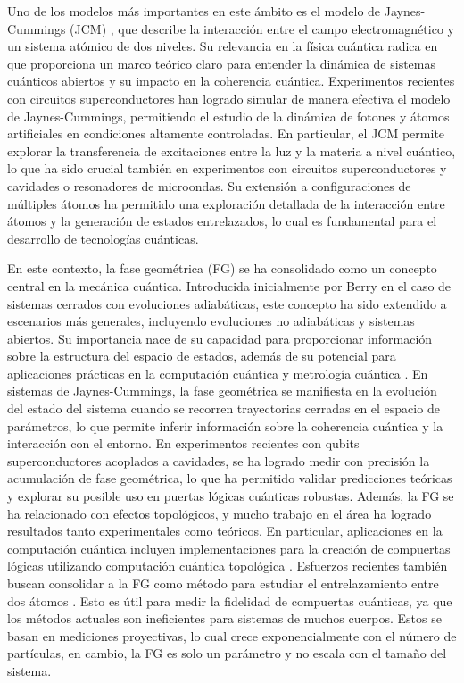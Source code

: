 Uno de los modelos más importantes en este ámbito es el modelo de Jaynes-Cummings (JCM) \cite{JCoriginal}, que describe la interacción entre el campo electromagnético y un sistema atómico de dos niveles. Su relevancia en la física cuántica radica en que proporciona un marco teórico claro para entender la dinámica de sistemas cuánticos abiertos y su impacto en la coherencia cuántica. Experimentos recientes con circuitos superconductores han logrado simular de manera efectiva el modelo de Jaynes-Cummings, permitiendo el estudio de la dinámica de fotones y átomos artificiales en condiciones altamente controladas. En particular, el JCM permite explorar la transferencia de excitaciones entre la luz y la materia a nivel cuántico, lo que ha sido crucial también en experimentos con circuitos superconductores y cavidades o resonadores de microondas. Su extensión a configuraciones de múltiples átomos ha permitido una exploración detallada de la interacción entre átomos y la generación de estados entrelazados, lo cual es fundamental para el desarrollo de tecnologías cuánticas. 

En este contexto, la fase geométrica (FG) se ha consolidado como un concepto central en la mecánica cuántica. Introducida inicialmente por Berry \cite{Berry1984} en el caso de sistemas cerrados con evoluciones adiabáticas, este concepto ha sido extendido a escenarios más generales, incluyendo evoluciones no adiabáticas y sistemas abiertos. Su importancia nace de su capacidad para proporcionar información sobre la estructura del espacio de estados, además de su potencial para aplicaciones prácticas en la computación cuántica y metrología cuántica \cite{Ericsson2000,Johnsson2020,Shapere1989}. En sistemas de Jaynes-Cummings, la fase geométrica se manifiesta en la evolución del estado del sistema cuando se recorren trayectorias cerradas en el espacio de parámetros, lo que permite inferir información sobre la coherencia cuántica y la interacción con el entorno. En experimentos recientes con qubits superconductores acoplados a cavidades, se ha logrado medir con precisión la acumulación de fase geométrica, lo que ha permitido validar predicciones teóricas y explorar su posible uso en puertas lógicas cuánticas robustas. Además, la FG se ha relacionado con efectos topológicos, y mucho trabajo en el área ha logrado resultados tanto experimentales como teóricos. En particular, aplicaciones en la computación cuántica incluyen implementaciones para la creación de compuertas lógicas utilizando computación cuántica topológica \cite{Vedral2003,Wilczek1984,Zee1988}. Esfuerzos recientes también buscan consolidar a la FG como método para estudiar el entrelazamiento entre dos átomos \cite{Ganesh2025}. Esto es útil para medir la fidelidad de compuertas cuánticas, ya que los métodos actuales son ineficientes para sistemas de muchos cuerpos. Estos se basan en mediciones proyectivas, lo cual crece exponencialmente con el número de partículas, en cambio, la FG es solo un parámetro y no escala con el tamaño del sistema.

